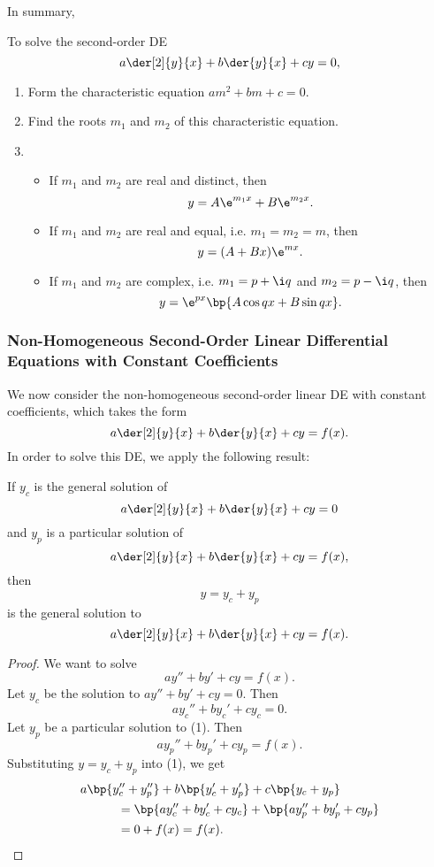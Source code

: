 In summary,
\begin{recipe}
    To solve the second-order DE \[a \der[2]{y}{x} + b \der{y}{x} + cy = 0,\]
    \renewcommand{\theenumi}{\arabic{enumi}.}%
    \begin{enumerate}
        \item Form the characteristic equation $am^2 + bm + c = 0$.
        \item Find the roots $m_1$ and $m_2$ of this characteristic equation.
        \item \begin{itemize}
            \item If $m_1$ and $m_2$ are real and distinct, then \[y = A \e^{m_1 x} + B \e^{m_2 x}.\]
            \item If $m_1$ and $m_2$ are real and equal, i.e. $m_1 = m_2 = m$, then \[y = (A + Bx) \e^{m x}.\]
            \item If $m_1$ and $m_2$ are complex, i.e. $m_1 = p + \i q$ and $m_2 = p - \i q$, then \[y = \e^{px} \bp{A \cos qx + B \sin qx}.\]
        \end{itemize}
    \end{enumerate}    
    \renewcommand{\theenumi}{(\alph{enumi})}
\end{recipe}

\subsubsection{Non-Homogeneous Second-Order Linear Differential Equations with Constant Coefficients}

We now consider the non-homogeneous second-order linear DE with constant coefficients, which takes the form \[a \der[2]{y}{x} + b \der{y}{x} + c y = f(x).\] In order to solve this DE, we apply the following result:

\begin{theorem}
    If $y_c$ is the general solution of \[a \der[2]{y}{x} + b \der{y}{x} + c y = 0\] and $y_p$ is a particular solution of \[a \der[2]{y}{x} + b \der{y}{x} + c y = f(x),\] then \[y = y_c + y_p\] is the general solution to \[a \der[2]{y}{x} + b \der{y}{x} + c y = f(x).\]
\end{theorem}
\begin{proof}
    We want to solve \[ay'' + by' + cy = f(x). \tag{1}\] Let $y_c$ be the solution to $ay'' + by' + cy = 0$. Then \[a y_c'' + by_c' + cy_c = 0.\] Let $y_p$ be a particular solution to (1). Then \[ay_p'' + by_p' + cy_p = f(x).\] Substituting $y = y_c + y_p$ into (1), we get
    \begin{align*}
        &a\bp{y_c'' + y_p''} + b\bp{y_c' + y_p'} + c\bp{y_c + y_p}\\
        &\hspace{3em}= \bp{a y_c'' + by_c' + cy_c} + \bp{ay_p'' + by_p' + cy_p}\\
        &\hspace{3em}= 0 + f(x) = f(x).
    \end{align*}
\end{proof}

